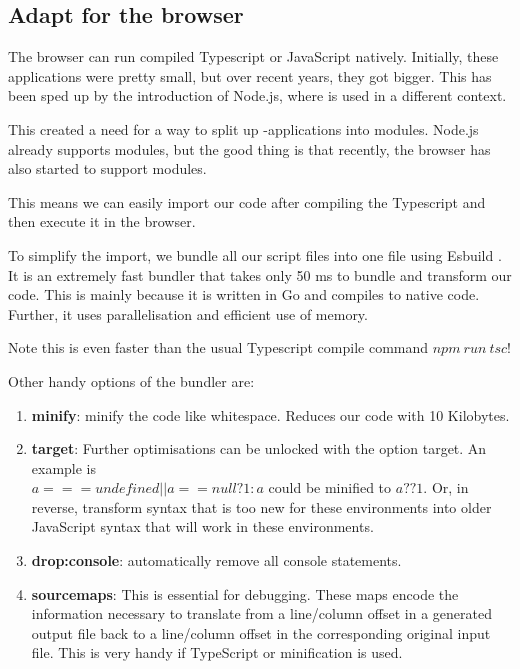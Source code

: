 

\subsection{Adapt for the browser}
The browser can run compiled Typescript or JavaScript natively. Initially, these  applications were pretty small, but over recent years, they got bigger. This has been sped up by the introduction of Node.js, where  is used in a different context. 

This created a need for a way to split up -applications into modules. Node.js already supports modules, but the good thing is that recently, the browser has also started to support modules. \cite{noauthor_javascript_2024}

This means we can easily import our  code after compiling the Typescript and then execute it in the browser.

To simplify the import, we bundle all our script files into one file using Esbuild \cite{noauthor_esbuild_nodate}. It is an extremely fast bundler that takes only 50 ms to bundle and transform our code. This is mainly because it is written in Go and compiles to native code. Further, it uses parallelisation and efficient use of memory.

Note this is even faster than the usual Typescript compile command $npm\ run\ tsc$!

Other handy options of the bundler are:
\begin{enumerate}
    \item \textbf{minify}: minify the code like whitespace. Reduces our code with 10 Kilobytes.
    \item \textbf{target}: Further optimisations can be unlocked with the option target. An example is \\$a === undefined || a == null? 1 : a$ could be minified to $a ?? 1$. Or, in reverse, transform  syntax that is too new for these environments into older JavaScript syntax that will work in these environments.
    \item \textbf{drop:console}: automatically remove all console statements.
    \item \textbf{sourcemaps}: This is essential for debugging. These maps encode the information necessary to translate from a line/column offset in a generated output file back to a line/column offset in the corresponding original input file. This is very handy if TypeScript or minification is used.
\end{enumerate}

